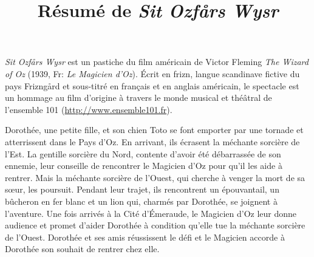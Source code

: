 \documentclass{article}
\title{Résumé de \emph{Sit Ozfårs Wysr}}
\author{}
\date{}
\begin{document}
\maketitle
\thispagestyle{empty}
\emph{Sit Ozfårs Wysr} est un pastiche du film américain
de Victor Fleming \emph{The Wizard of Oz} (1939, Fr: \emph{Le Magicien
d'Oz}).
Écrit en frizn, langue
scandinave fictive du pays Frizngård et \og{}sous-titré\fg{} en français et
en anglais
américain,
le spectacle est un hommage au film d'origine à travers le monde musical et
théâtral de
l'ensemble 101 (\url{http://www.ensemble101.fr}).\par
Dorothée, une petite fille, et son chien Toto se font emporter par une
tornade et atterrissent dans le Pays d'Oz. En arrivant, ils écrasent la méchante sorcière de
l'Est. La gentille sorcière du Nord, contente d'avoir été débarrassée de son
ennemie, leur conseille de rencontrer le
Magicien d'Oz pour qu'il les aide à rentrer. Mais la méchante
sorcière de l'Ouest, qui cherche à venger la mort de sa sœur, les poursuit.
Pendant leur trajet, ils rencontrent un épouvantail, un bûcheron en fer
blanc et un lion qui, charmés par Dorothée, se joignent à l'aventure. Une
fois arrivés à la Cité d'Émeraude, le Magicien d'Oz leur donne
audience et promet d'aider Dorothée à
condition qu'elle tue la méchante sorcière de l'Ouest. Dorothée et ses amis
réussissent le défi et le Magicien accorde à Dorothée son souhait de
rentrer chez elle.
\end{document}
